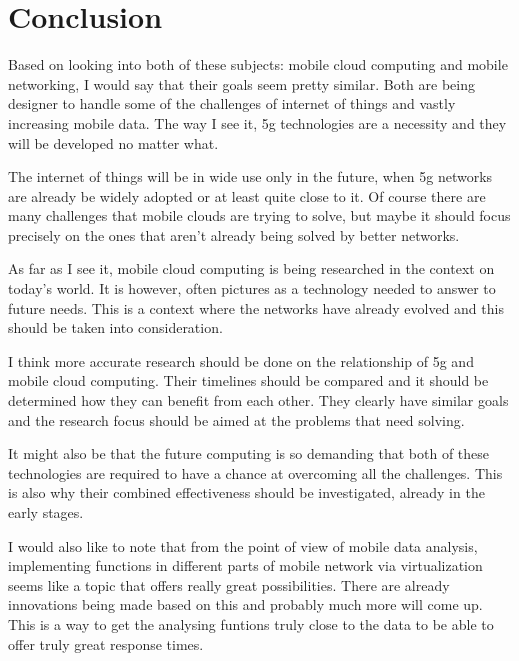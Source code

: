 \documentclass[conference]{IEEEtran}
\begin{document}
\section{Conclusion}
Based on looking into both of these subjects: mobile cloud computing and mobile networking, I would say that their goals seem pretty similar. Both are being designer to handle some of the challenges of internet of things and vastly increasing mobile data. The way I see it, 5g technologies are a necessity and they will be developed no matter what.
\par
The internet of things will be in wide use only in the future, when 5g networks are already be widely adopted or at least quite close to it. Of course there are many challenges that mobile clouds are trying to solve, but maybe it should focus precisely on the ones that aren't already being solved by better networks.
\par
As far as I see it, mobile cloud computing is being researched in the context on today's world. It is however, often pictures as a technology needed to answer to future needs. This is a context where the networks have already evolved and this should be taken into consideration.
\par
I think more accurate research should be done on the relationship of 5g and mobile cloud computing. Their timelines should be compared and it should be determined how they can benefit from each other. They clearly have similar goals and the research focus should be aimed at the problems that need solving.
\par
It might also be that the future computing is so demanding that both of these technologies are required to have a chance at overcoming all the challenges. This is also why their combined effectiveness should be investigated, already in the early stages.
\par
I would also like to note that from the point of view of mobile data analysis, implementing functions in different parts of mobile network via virtualization seems like a topic that offers really great possibilities. There are already innovations being made based on this and probably much more will come up. This is a way to get the analysing funtions truly close to the data to be able to offer truly great response times.
\end{document}
